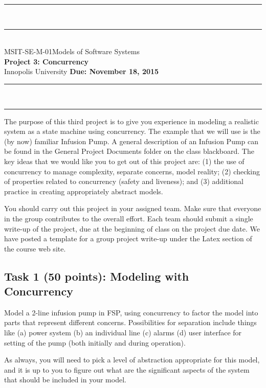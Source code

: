 \documentclass{article}
\newcommand{\head}{\subsection*}
\begin{document}
\begin{center}
\rule{\textwidth}{1.5pt} \\ \rule[10pt]{\textwidth}{1pt}\\
MSIT-SE-M-01\hfill Models of Software Systems\\[3ex]
{\Large\bf Project 3: Concurrency}\\[3ex]
Innopolis University \hfill {\bf Due: November 18, 2015} \rule{\textwidth}{1pt}
\\\rule[9.5pt]{\textwidth}{1.5pt}
\end{center}

The purpose of this third project is to give you experience in
modeling a realistic system as a state machine using concurrency.
The example that we will use is the (by now) familiar Infusion Pump.
A general description of an Infusion Pump can be found in the
General Project Documents folder on the class blackboard. The key
ideas that we would like you to get out of this project are: (1) the
use of concurrency to manage complexity, separate concerns, model
reality; (2) checking of properties related to concurrency (safety
and liveness); and (3) additional practice in creating appropriately
abstract models.

\bigskip You should carry out this project in your assigned team. Make sure that everyone in the
group contributes to the overall effort. Each team should submit a single write-up of the project,
due at the beginning of class on the project due date. We have posted a template for a group
project write-up under the Latex section of the course web site.

\head{Task 1 (50 points): Modeling with Concurrency}

Model a 2-line infusion pump in FSP, using concurrency to factor the model into parts that
represent different concerns. Possibilities for separation include things like (a) power system (b) an individual line
(c) alarms (d) user interface for setting of the pump (both initially and during operation).

\bigskip

As always, you will need to pick a level of abstraction appropriate for this model, and it is up to
you to figure out what are the significant aspects of the system that should be included in your
model.
\end{document}
